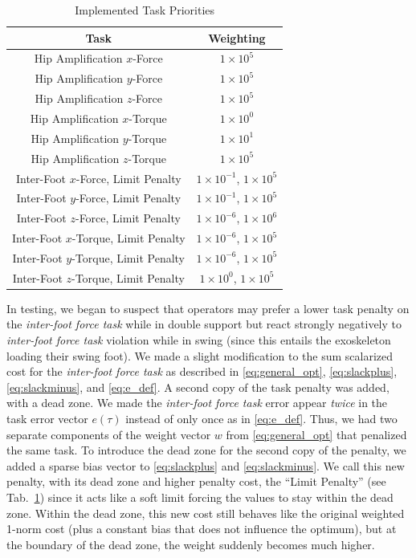 \documentclass[utf8]{frontiersSCNS}
\begin{document}
\begin{table}[tb]\centering
	\begin{tabular}{cc}
		\toprule
		Task & Weighting\\
		\midrule
		Hip Amplification $x$-Force & $1\times 10^{5}$\\
		Hip Amplification $y$-Force & $1\times 10^{5}$\\
		Hip Amplification $z$-Force & $1\times 10^{5}$\\
		Hip Amplification $x$-Torque & $1\times 10^{0}$\\
		Hip Amplification $y$-Torque & $1\times 10^{1}$\\
		Hip Amplification $z$-Torque & $1\times 10^{5}$\\
		Inter-Foot $x$-Force, Limit Penalty& $1\times 10^{-1}$, $1\times 10^{5}$\\
		Inter-Foot $y$-Force, Limit Penalty & $1\times 10^{-1}$, $1\times 10^{5}$\\
		Inter-Foot $z$-Force, Limit Penalty & $1\times 10^{-6}$, $1\times 10^{6}$\\
		Inter-Foot $x$-Torque, Limit Penalty & $1\times 10^{-6}$, $1\times 10^{5}$\\
		Inter-Foot $y$-Torque, Limit Penalty & $1\times 10^{-6}$, $1\times 10^{5}$\\
		Inter-Foot $z$-Torque, Limit Penalty & $1\times 10^{0}$, $1\times 10^{5}$\\
		\bottomrule
	\end{tabular}
	\caption{Implemented Task Priorities}\label{tab:priorities}
\end{table}

In testing, we began to suspect that operators may prefer a lower task penalty on the \emph{inter-foot force task} while in double support but react strongly negatively to \emph{inter-foot force task} violation while in swing (since this entails the exoskeleton loading their swing foot).
We made a slight modification to the sum scalarized cost for the \emph{inter-foot force task} as described in \eqref{eq:general_opt}, \eqref{eq:slackplus}, \eqref{eq:slackminus}, and \eqref{eq:e_def}. 
A second copy of the task penalty was added, with a dead zone. We made the \emph{inter-foot force task} error appear \emph{twice} in the task error vector $e(\tau)$ instead of only once as in \eqref{eq:e_def}. Thus, we had two separate components of the weight vector $w$ from \eqref{eq:general_opt} that penalized the same task. To introduce the dead zone for the second copy of the penalty, we added a sparse bias vector to \eqref{eq:slackplus} and \eqref{eq:slackminus}. We call this new penalty, with its dead zone and higher penalty cost, the ``Limit Penalty'' (see Tab.~\ref{tab:priorities}) since it acts like a soft limit forcing the values to stay within the dead zone. Within the dead zone, this new cost still behaves like the original weighted 1-norm cost (plus a constant bias that does not influence the optimum), but at the boundary of the dead zone, the weight suddenly becomes much higher.
\end{document}
